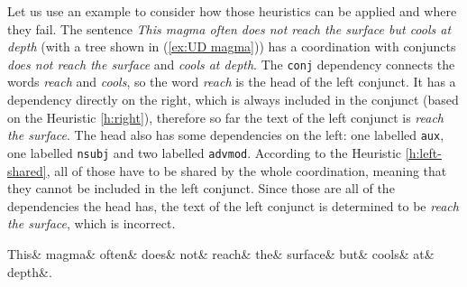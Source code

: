 Let us use an example to consider how those heuristics can be applied and where they fail. The sentence \textsl{This magma often does not reach the surface but cools at depth} (with a tree shown in (\ref{ex:UD magma})) has a coordination with conjuncts \textsl{does not reach the surface} and \textsl{cools at depth}. The \texttt{conj} dependency connects the words \textsl{reach} and \textsl{cools}, so the word \textsl{reach} is the head of the left conjunct. It has a dependency directly on the right, which is always included in the conjunct (based on the Heuristic \ref{h:right}), therefore so far the text of the left conjunct is \textsl{reach the surface}. The head also has some dependencies on the left: one labelled \texttt{aux}, one labelled \texttt{nsubj} and two labelled \texttt{advmod}. According to the Heuristic \ref{h:left-shared}, all of those have to be shared by the whole coordination, meaning that they cannot be included in the left conjunct. Since those are all of the dependencies the head has, the text of the left conjunct is determined to be \textsl{reach the surface}, which is incorrect. 

{\small
\begin{exe}
    \ex\label{ex:UD magma}
    \begin{dependency}[hide label, baseline=-\the\dimexpr\fontdimen22\textfont2\relax]
        \begin{deptext}
            This\& magma\& often\& does\& not\& reach\& the\& surface\& but\& cools\& at\& depth\&.\footnotemark\\
        \end{deptext}
\end{dependency}
\end{exe}
}

